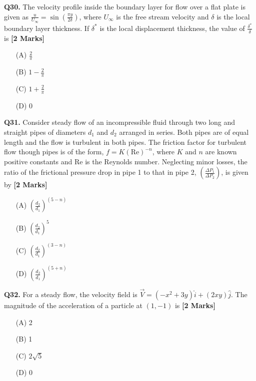 \documentclass[11pt]{article}
\newcommand{\questionb}[2]{
    \noindent\textbf{Q#2.} #1 \hfill \textbf{[2 Marks]}
}
\begin{document}
\questionb{The velocity profile inside the boundary layer for flow over a flat plate is given as \(\frac{u}{U_{\infty}} = \sin \left( \frac{\pi y}{2 \delta} \right)\), where \( U_{\infty} \) is the free stream velocity and \(\delta\) is the local boundary layer thickness. If \(\delta^*\) is the local displacement thickness, the value of \(\frac{\delta^*}{\delta}\) is}{30}
\begin{enumerate}
    \item[(A)] \(\frac{2}{\pi}\)
    \item[(B)] \(1 - \frac{2}{\pi}\)
    \item[(C)] \(1 + \frac{2}{\pi}\)
    \item[(D)] 0
\end{enumerate}
\vspace{0.5cm}

\questionb{Consider steady flow of an incompressible fluid through two long and straight pipes of diameters \( d_1 \) and \( d_2 \) arranged in series. Both pipes are of equal length and the flow is turbulent in both pipes. The friction factor for turbulent flow though pipes is of the form, \( f = K(\text{Re})^{-n} \), where \( K \) and \( n \) are known positive constants and Re is the Reynolds number. Neglecting minor losses, the ratio of the frictional pressure drop in pipe 1 to that in pipe 2, \(\left( \frac{\Delta P_1}{\Delta P_2} \right)\), is given by}{31}
\begin{enumerate}
    \item[(A)] \(\left( \frac{d_2}{d_1} \right)^{(5-n)}\)
    \item[(B)] \(\left( \frac{d_2}{d_1} \right)^5\)
    \item[(C)] \(\left( \frac{d_2}{d_1} \right)^{(3-n)}\)
    \item[(D)] \(\left( \frac{d_2}{d_1} \right)^{(5+n)}\)
\end{enumerate}
\vspace{0.5cm}

\questionb{For a steady flow, the velocity field is \(\vec{V} = (-x^2 + 3y) \hat{i} + (2xy) \hat{j}\). The magnitude of the acceleration of a particle at \((1, -1)\) is}{32}
\begin{enumerate}
    \item[(A)] 2
    \item[(B)] 1
    \item[(C)] \(2\sqrt{5}\)
    \item[(D)] 0
\end{enumerate}
\vspace{0.5cm}
\end{document}
